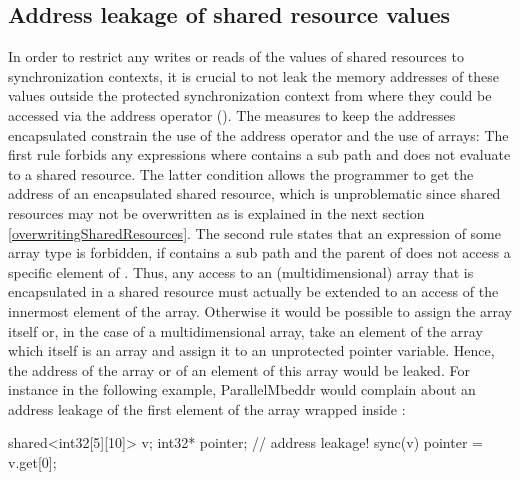 \subsection{Address leakage of shared resource values}
In order to restrict any writes or reads of the values of shared resources to synchronization contexts, it is crucial to not leak the memory addresses of these values outside the protected synchronization context from where they could be accessed via the address operator (\CODE{\&}). The measures to keep the addresses encapsulated constrain the use of the address operator and the use of arrays: The first rule forbids any expressions  where  contains a sub path  and  does not evaluate to a shared resource. The latter condition allows the programmer to get the address of an encapsulated shared resource, which is unproblematic since shared resources may not be overwritten as is explained in the next section \ref{overwritingSharedResources}. The second rule states that an expression  of some array type is forbidden, if  contains a sub path  and the parent of  does not access a specific element of . Thus, any access to an (multidimensional) array that is encapsulated in a shared resource must actually be extended to an access of the innermost element of the array. Otherwise it would be possible to assign the array itself or, in the case of a multidimensional array, take an element of the array which itself is an array and assign it to an unprotected pointer variable. Hence, the address of the array or of an element of this array would be leaked. For instance in the following example, ParallelMbeddr would complain about an address leakage of the first element of the array wrapped inside :
\begin{ccode}
shared<int32[5][10]> v;
int32* pointer;
// address leakage!
sync(v) { pointer = v.get[0]; }
\end{ccode}


